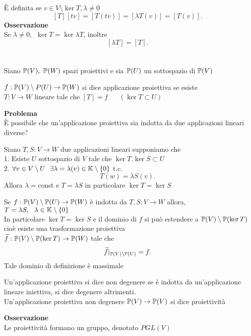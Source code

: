 \documentclass[12px]{article}
\begin{document}
È definita se $v\in V\setminus\ker T, \lambda\neq 0$\\
 \[
	 [T][tv] =[T(tv)] = [\lambda T(v)] = [T(v)]
.\] 
\textbf{Osservazione}\\
Se $\lambda\neq 0,\ \ \ker T= \ker \lambda T$, inoltre
 \[
	 [\lambda T] = [T]
.\] 
\ \\ \hline \ \\
Siano $\mathbb{P}(V),\ \mathbb{P}(W)$ spazi proiettivi e sia $\mathbb{P}(U)$ un sottospazio di $\mathbb{P}(V)$
 \begin{defi}
	 $f:\mathbb{P}(V)\setminus P(U) \rightarrow\mathbb{P}(W)$ si dice applicazione proiettiva se esiste \\$T: V \rightarrow W$ lineare tale che $[T] = f$  $ \ \ \ \ \ \ (\ker T\subset U)$
\end{defi}
\textbf{Problema}\\
È possibile che un'applicazione proiettiva sia indotta da due applicazioni lineari diverse?
\begin{prop}
	Siano $T,S :V \rightarrow W$ due applicazioni lineari supponiamo che \\
	$1.$ Esiste $U$ sottospazio di $V$ tale che $\ker T. \ker S\subset U$\\
	$2.$  $\forall v\in V\setminus U \ \ \exists \lambda = \lambda(v)\in\mathbb{K}\setminus\{0\}$ t.c.
	\[
	T(w) = \lambda S(v)
	.\] 
	Allora $\lambda =$const e $T=\lambda S$ in particolare  $\ker T = \ker S$
\end{prop}
\begin{coro}
	Se $f:\mathbb{P}(V)\setminus\mathbb{P}(U) \rightarrow\mathbb{P}(W)$ è indotta da $T,S:V \rightarrow W$ allora, $T = \lambda S, \ \ \lambda\in\K\setminus\{0\}$\\
	In particolare $\ker T=\ker S$ e il dominio di $f$ si può estendere a $\mathbb{P}(V)\setminus\mathbb{P}(\ker T)$ cioè esiste una trasformazione proiettiva \\ $\widetilde{f}:\mathbb{P}(V)\setminus\mathbb{P}(\ker T) \rightarrow \mathbb{P}(W)$ tale che 
	\[
		\widetilde{f}|_{\mathbb{P}(V)\setminus\mathbb{P}(U)} = f
	.\] 
	Tale dominio di definizione è massimale
\end{coro}
\begin{defi}
	Un'applicazione proiettiva si dice non degenere se è indotta da un'applicazione lineare iniettiva, si dice degenere altrimenti.\\
	Un'applicazione proiettiva non degenere $\mathbb{P}(V) \rightarrow \mathbb{P}(V)$
	si dice proiettività
\end{defi}
\textbf{Osservazione}\\
Le proiettività formano un gruppo, denotato $PGL(V)$\\
\end{document}
